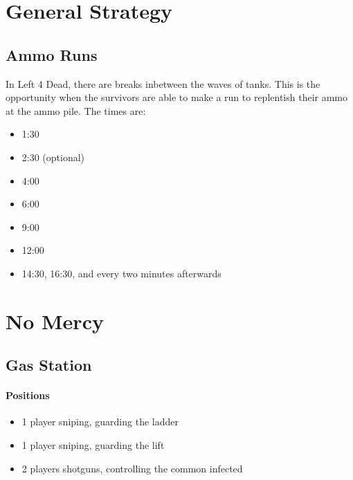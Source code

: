 \section{General Strategy}

\subsection{Ammo Runs}
In Left 4 Dead, there are breaks inbetween the waves of tanks. This is the opportunity when the survivors are able to make a run to replentish their ammo at the ammo pile. The times are:
\begin{itemize}
\item 1:30
\item 2:30 (optional)
\item 4:00
\item 6:00
\item 9:00
\item 12:00
\item 14:30, 16:30, and every two minutes afterwards
\end{itemize}

\section{No Mercy}

\subsection{Gas Station}
\paragraph{Positions}
\begin{itemize}
\item 1 player sniping, guarding the ladder
\item 1 player sniping, guarding the lift
\item 2 players shotguns, controlling the common infected
\end{itemize}

